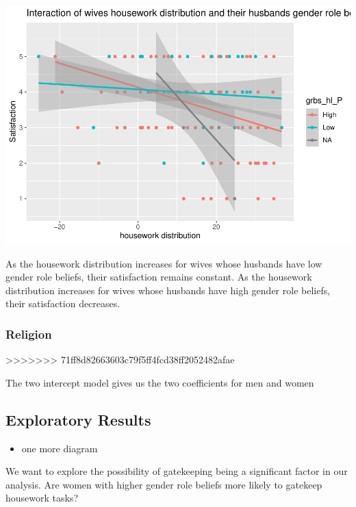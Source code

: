 \documentclass[
  man,floatsintext]{apa6}
\providecommand{\tightlist}{%
  \setlength{\itemsep}{0pt}\setlength{\parskip}{0pt}}
\begin{document}
\includegraphics{results_files/figure-latex/unnamed-chunk-10-1.pdf}

As the housework distribution increases for wives whose husbands have low gender role beliefs, their satisfaction remains constant. As the housework distribution increases for wives whose husbands have high gender role beliefs, their satisfaction decreases.

\hypertarget{religion}{%
\subsubsection{Religion}\label{religion}}
>>>>>>> 71ff8d82663603c79f5ff4fcd38ff2052482afae

The two intercept model gives us the two coefficients for men and women

\hypertarget{exploratory-results}{%
\subsection{Exploratory Results}\label{exploratory-results}}

\begin{itemize}
\tightlist
\item
  one more diagram
\end{itemize}

We want to explore the possibility of gatekeeping being a significant factor in our analysis. Are women with higher gender role beliefs more likely to gatekeep housework tasks?


\clearpage
\renewcommand{\listfigurename}{Figure captions}

\clearpage
\renewcommand{\listtablename}{Table captions}
\end{document}
